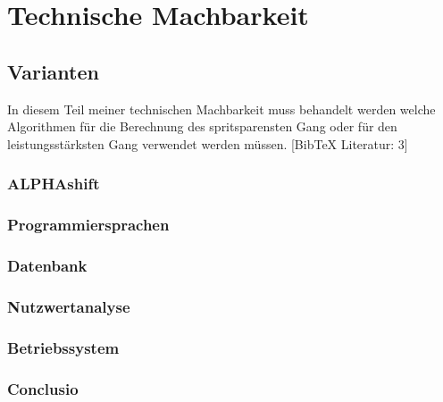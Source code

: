 \chapter {Technische Machbarkeit}
\section {Varianten}
In diesem Teil meiner technischen Machbarkeit muss behandelt werden welche Algorithmen für die Berechnung des spritsparensten Gang oder für den leistungsstärksten Gang verwendet werden müssen.
[BibTeX Literatur: 3]
\subsection {ALPHAshift}


\subsection {Programmiersprachen}
\subsection {Datenbank}
\subsection {Nutzwertanalyse}
\subsection {Betriebssystem}
\subsection {Conclusio}